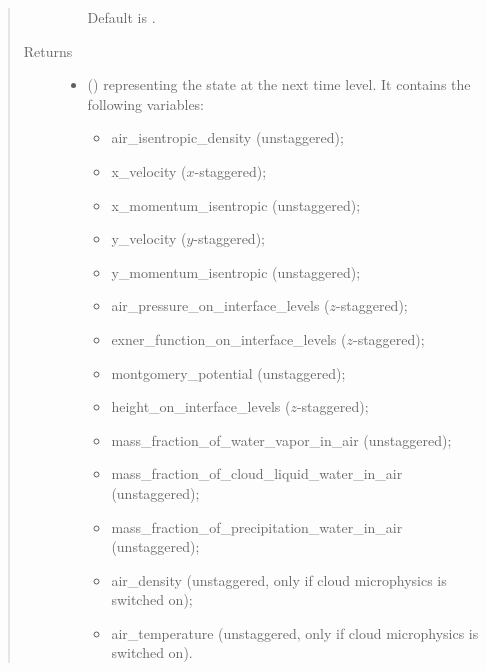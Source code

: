 \documentclass[letterpaper,10pt,english]{sphinxmanual}
\begin{document}
\begin{fulllineitems}
\begin{fulllineitems}
\begin{quote}
\begin{description}
\begin{itemize}
\begin{itemize}
\end{itemize}

Default is .


\end{itemize}

\item[{Returns}] \leavevmode
\begin{itemize}
\item {} 
 () \textendash{} {\hyperref[\detokenize{api:tasmania.storages.state_isentropic.StateIsentropic}]{}} representing the state at the next time level.
It contains the following variables:
\begin{itemize}
\item {} 
air\_isentropic\_density (unstaggered);

\item {} 
x\_velocity (\(x\)-staggered);

\item {} 
x\_momentum\_isentropic (unstaggered);

\item {} 
y\_velocity (\(y\)-staggered);

\item {} 
y\_momentum\_isentropic (unstaggered);

\item {} 
air\_pressure\_on\_interface\_levels (\(z\)-staggered);

\item {} 
exner\_function\_on\_interface\_levels (\(z\)-staggered);

\item {} 
montgomery\_potential (unstaggered);

\item {} 
height\_on\_interface\_levels (\(z\)-staggered);

\item {} 
mass\_fraction\_of\_water\_vapor\_in\_air (unstaggered);

\item {} 
mass\_fraction\_of\_cloud\_liquid\_water\_in\_air (unstaggered);

\item {} 
mass\_fraction\_of\_precipitation\_water\_in\_air (unstaggered);

\item {} 
air\_density (unstaggered, only if cloud microphysics is switched on);

\item {} 
air\_temperature (unstaggered, only if cloud microphysics is switched on).


\end{itemize}
\end{itemize}
\end{description}
\end{quote}
\end{fulllineitems}
\end{fulllineitems}
\end{document}
